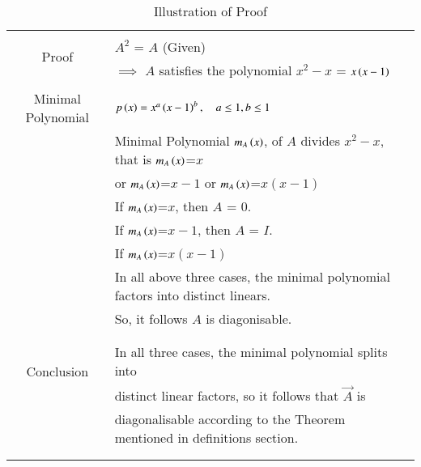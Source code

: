 \begin{longtable}{|c|l|}
    \hline
	\multirow{3}{*}{Proof} 
	& \\
	& $A^2$ = $A$ (Given)\\
	& $\implies$ $A$ satisfies the polynomial $x^2-x$ = $x\left(x-1\right)$\\
	&\\
	\hline
	\multirow{3}{*}{Minimal Polynomial} & \\
	& $p\left(x\right)=x^a\left(x-1\right)^b,\quad a\leq1, b\leq1$\\
	& \\
	& Minimal Polynomial $m_A\left(x\right)$, of $A$ divides $x^2-x$, that is $m_A\left(x\right)$=$x$\\
	& or $m_A\left(x\right)$=$x-1$ or $m_A\left(x\right)$=$x(x-1)$\\
	& If $m_A\left(x\right)$=$x$, then $A$ = $0$.\\
	& If $m_A\left(x\right)$=$x-1$, then $A$ = $I$.\\
	& If $m_A\left(x\right)$=$x(x-1)$ \\
	& In all above three cases, the minimal polynomial factors into distinct linears.\\
	& So, it follows $A$ is diagonisable.\\
	&\\
	\hline
	\multirow{3}{*}{Conclusion} & \\
	& In all three cases, the minimal polynomial splits into\\ & distinct linear factors, so it follows that $\vec{A}$ is\\ 
	& diagonalisable according to the Theorem mentioned in definitions section.\\
	&\\
	\hline
	\caption{Illustration of Proof}
    \label{eq:solutions/6/4/5/table:2}
\end{longtable}
